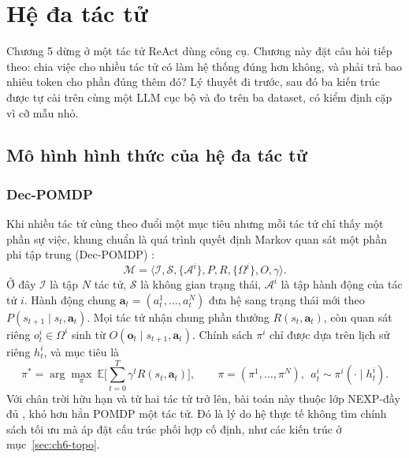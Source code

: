 \chapter{Hệ đa tác tử}\label{chap:ch6}

Chương 5 dừng ở một tác tử ReAct dùng công cụ. Chương này đặt câu hỏi tiếp theo: chia việc cho nhiều tác tử có làm hệ thống đúng hơn không, và phải trả bao nhiêu token cho phần đúng thêm đó? Lý thuyết đi trước, sau đó ba kiến trúc được tự cài trên cùng một LLM cục bộ và đo trên ba dataset, có kiểm định cặp vì cỡ mẫu nhỏ.

\section{Mô hình hình thức của hệ đa tác tử}

\subsection{Dec-POMDP}
Khi nhiều tác tử cùng theo đuổi một mục tiêu nhưng mỗi tác tử chỉ thấy một phần sự việc, khung chuẩn là quá trình quyết định Markov quan sát một phần phi tập trung (Dec-POMDP) \cite{ch6bernstein2002,ch6oliehoek2016}:
\begin{equation}
\mathcal{M}=\langle \mathcal{I},\mathcal{S},\{\mathcal{A}^i\},P,R,\{\Omega^i\},O,\gamma\rangle .
\end{equation}
Ở đây $\mathcal{I}$ là tập $N$ tác tử, $\mathcal{S}$ là không gian trạng thái, $\mathcal{A}^i$ là tập hành động của tác tử $i$. Hành động chung $\mathbf{a}_t=(a^1_t,\dots,a^N_t)$ đưa hệ sang trạng thái mới theo $P(s_{t+1}\mid s_t,\mathbf{a}_t)$. Mọi tác tử nhận chung phần thưởng $R(s_t,\mathbf{a}_t)$, còn quan sát riêng $o^i_t\in\Omega^i$ sinh từ $O(\mathbf{o}_t\mid s_{t+1},\mathbf{a}_t)$. Chính sách $\pi^i$ chỉ được dựa trên lịch sử riêng $h^i_t$, và mục tiêu là
\begin{equation}
\pi^*=\arg\max_{\pi}\ \mathbb{E}\Big[\sum_{t=0}^{T}\gamma^t R(s_t,\mathbf{a}_t)\Big],\qquad \pi=(\pi^1,\dots,\pi^N),\ \ a^i_t\sim\pi^i(\cdot\mid h^i_t).
\end{equation}
Với chân trời hữu hạn và từ hai tác tử trở lên, bài toán này thuộc lớp NEXP-đầy đủ \cite{ch6bernstein2002}, khó hơn hẳn POMDP một tác tử. Đó là lý do hệ thực tế không tìm chính sách tối ưu mà áp đặt cấu trúc phối hợp cố định, như các kiến trúc ở mục~\ref{sec:ch6-topo}.



